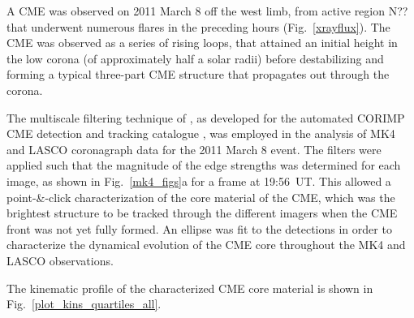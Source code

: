\documentclass[preprint2]{aastex}
\begin{document}
A CME was observed on 2011 March 8 off the west limb, from active region N?? that underwent numerous flares in the preceding hours (Fig.~\ref{xrayflux}). The CME was observed as a series of rising loops, that attained an initial height in the low corona (of approximately half a solar radii) before destabilizing and forming a typical three-part CME structure that propagates out through the corona.

The multiscale filtering technique of \citet{2008SoPh..248..457Y}, as developed for the automated CORIMP CME detection and tracking catalogue \citep{2012ApJ...752..145B}, was employed in the analysis of MK4 and LASCO coronagraph data for the 2011 March 8 event. The filters were applied such that the magnitude of the edge strengths was determined for each image, as shown in Fig.~\ref{mk4_figs}a for a frame at 19:56~UT. This allowed a point-\&-click characterization of the core material of the CME, which was the brightest structure to be tracked through the different imagers when the CME front was not yet fully formed. An ellipse was fit to the detections in order to characterize the dynamical evolution of the CME core throughout the MK4 and LASCO observations.

The kinematic profile of the characterized CME core material is shown in Fig.~\ref{plot_kins_quartiles_all}.
\end{document}
